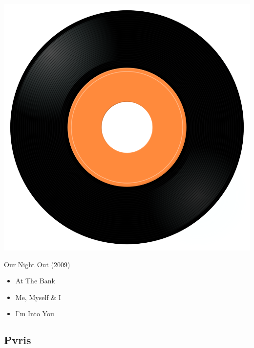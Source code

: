 \begin{minipage}[t]{0.25\textwidth}
\captionsetup{type=figure}
\includegraphics[width=\textwidth]{Images/cover.png}
\caption*{Our Night Out (2009)}
\end{minipage}
\begin{minipage}[t]{0.25\textwidth}\vspace{0pt}
\begin{itemize}[nosep,leftmargin=1em,labelwidth=*,align=left]
	\setlength{\itemsep}{0pt}
	\item At The Bank 
	\item Me, Myself \& I
	\item I'm Into You
\end{itemize}
\end{minipage}

\subsection{Pvris}

